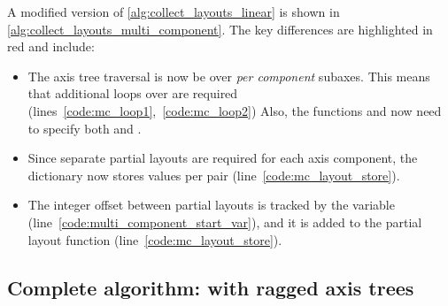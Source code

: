 \documentclass[thesis]{subfiles}
\begin{document}
A modified version of \cref{alg:collect_layouts_linear} is shown in \cref{alg:collect_layouts_multi_component}.
The key differences are highlighted in red and include:

\begin{itemize}
  \item
    The axis tree traversal is now be over \emph{per component} subaxes.
    This means that additional loops over  are required (lines~\ref{code:mc_loop1},~\ref{code:mc_loop2})
    Also, the functions  and  now need to specify both  and .

  \item
    Since separate partial layouts are required for each axis component, the  dictionary now stores values per  pair (line~\ref{code:mc_layout_store}).

  \item
    The integer offset between partial layouts is tracked by the  variable (line~\ref{code:multi_component_start_var}), and it is added to the partial layout function (line~\ref{code:mc_layout_store}).
\end{itemize}

\subsection{Complete algorithm: with ragged axis trees}
\label{sec:layout_alg_ragged}
\end{document}
